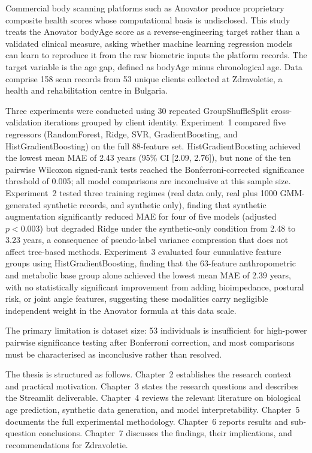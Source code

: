 \documentclass[11pt,a4paper]{report}
\begin{document}
Commercial body scanning platforms such as Anovator produce proprietary composite health scores
whose computational basis is undisclosed. This study treats the Anovator bodyAge score as a
reverse-engineering target rather than a validated clinical measure, asking whether machine
learning regression models can learn to reproduce it from the raw biometric inputs the platform
records. The target variable is the age gap, defined as bodyAge minus chronological age. Data
comprise 158 scan records from 53 unique clients collected at Zdravoletie, a health and
rehabilitation centre in Bulgaria.

Three experiments were conducted using 30 repeated GroupShuffleSplit cross-validation iterations
grouped by client identity. Experiment~1 compared five regressors (RandomForest, Ridge, SVR,
GradientBoosting, and HistGradientBoosting) on the full 88-feature set. HistGradientBoosting
achieved the lowest mean MAE of 2.43 years (95\% CI [2.09, 2.76]), but none of the ten pairwise
Wilcoxon signed-rank tests reached the Bonferroni-corrected significance threshold of 0.005; all
model comparisons are inconclusive at this sample size. Experiment~2 tested three training
regimes (real data only, real plus 1000 GMM-generated synthetic records, and synthetic only),
finding that synthetic augmentation significantly reduced MAE for four of five models (adjusted
$p < 0.003$) but degraded Ridge under the synthetic-only condition from 2.48 to 3.23 years, a
consequence of pseudo-label variance compression that does not affect tree-based methods.
Experiment~3 evaluated four cumulative feature groups using HistGradientBoosting, finding that
the 63-feature anthropometric and metabolic base group alone achieved the lowest mean MAE of 2.39
years, with no statistically significant improvement from adding bioimpedance, postural risk, or
joint angle features, suggesting these modalities carry negligible independent weight in the
Anovator formula at this data scale.

The primary limitation is dataset size: 53 individuals is insufficient for high-power pairwise
significance testing after Bonferroni correction, and most comparisons must be characterised as
inconclusive rather than resolved.

The thesis is structured as follows. Chapter~2 establishes the research context and practical
motivation. Chapter~3 states the research questions and describes the Streamlit deliverable.
Chapter~4 reviews the relevant literature on biological age prediction, synthetic data generation,
and model interpretability. Chapter~5 documents the full experimental methodology. Chapter~6
reports results and sub-question conclusions. Chapter~7 discusses the findings, their implications,
and recommendations for Zdravoletie.
\end{document}
